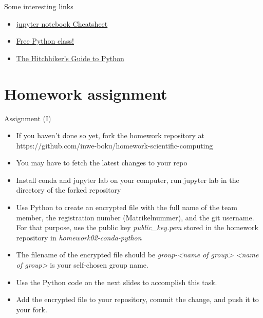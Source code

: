 \begin{frame}{Some interesting links}
	\begin{itemize}
		\item \href{https://www.edureka.co/blog/wp-content/uploads/2018/10/Jupyter_Notebook_CheatSheet_Edureka.pdf}{jupyter notebook Cheatsheet}

		\item \href{https://www.preisjaeger.at/deals/gratis-it-workshops-e-books-von-packtpubcom-227041}{Free Python class!}
		
		\item \href{https://docs.python-guide.org/}{The Hitchhiker's Guide to Python}
			
	\end{itemize}

	
\end{frame}


\section{Homework assignment}

\begin{frame}{Assignment (I)}
	
	\begin{itemize}
		\item If you haven't done so yet, fork the homework repository at https://github.com/inwe-boku/homework-scientific-computing
		\item You may have to fetch the latest changes to your repo
		\item Install conda and jupyter lab on your computer, run jupyter lab in the directory of the forked repository
		\item Use Python to create an encrypted file with the full name of the team member, the registration number (Matrikelnummer), and the git username. For that purpose, use the public key \textit{public\_key.pem} stored in the homework repository in \textit{homework02-conda-python}
		\item The filename of the encrypted file should be \textit{group-<name of group>} \textit{<name of group>} is your self-chosen group name.
		\item Use the Python code on the next slides to accomplish this task.
		\item Add the encrypted file to your repository, commit the change, and push it to your fork.
		
		
	\end{itemize}
	
	
\end{frame}

